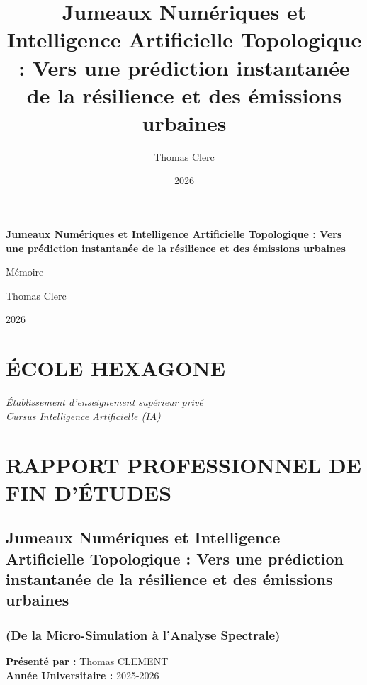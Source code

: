 \documentclass[11pt, a4paper]{article}
\title{Jumeaux Numériques et Intelligence Artificielle Topologique :
Vers une prédiction instantanée de la résilience et des émissions
urbaines}
\author{Thomas Clerc}
\date{2026}
\begin{document}
\begin{titlepage}
\centering
\vspace*{2cm}
{\Huge\bfseries Jumeaux Numériques et Intelligence Artificielle
Topologique : Vers une prédiction instantanée de la résilience et des
émissions urbaines\par}
\vspace{1.5cm}
{\Large Mémoire\par}
\vspace{1cm}
{\large Thomas Clerc\par}
\vspace{0.5cm}
{\large 2026\par}
\vfill
\end{titlepage}

\tableofcontents
\newpage

\section{ÉCOLE HEXAGONE}\label{uxe9cole-hexagone}

\emph{Établissement d'enseignement supérieur privé}\\
\emph{Cursus Intelligence Artificielle (IA)}

\section{RAPPORT PROFESSIONNEL DE FIN
D'ÉTUDES}\label{rapport-professionnel-de-fin-duxe9tudes}

\subsection{Jumeaux Numériques et Intelligence Artificielle Topologique
: Vers une prédiction instantanée de la résilience et des émissions
urbaines}\label{jumeaux-numuxe9riques-et-intelligence-artificielle-topologique-vers-une-pruxe9diction-instantanuxe9e-de-la-ruxe9silience-et-des-uxe9missions-urbaines}

\subsubsection{(De la Micro-Simulation à l'Analyse
Spectrale)}\label{de-la-micro-simulation-uxe0-lanalyse-spectrale}

\textbf{Présenté par :} Thomas CLEMENT\\
\textbf{Année Universitaire :} 2025-2026
\end{document}
